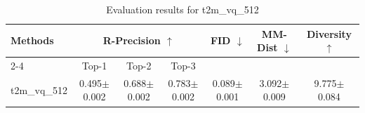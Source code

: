 \begin{table}[h]
\centering
\begin{tabular}{l ccc ccc}
\toprule
\multirow{2}{*}{\textbf{Methods}} & \multicolumn{3}{c}{\textbf{R-Precision $\uparrow$}} & \multirow{2}{*}{\textbf{FID $\downarrow$}} & \multirow{2}{*}{\textbf{MM-Dist $\downarrow$}} & \multirow{2}{*}{\textbf{Diversity $\uparrow$}} \\
\cmidrule(lr){2-4}
& Top-1 & Top-2 & Top-3 & & & \\
\midrule
t2m_vq_512 & 0.495$\pm$0.002 & 0.688$\pm$0.002 & 0.783$\pm$0.002 & 0.089$\pm$0.001 & 3.092$\pm$0.009 & 9.775$\pm$0.084 \\
\bottomrule
\end{tabular}
\caption{Evaluation results for t2m_vq_512}
\label{tab:results_t2m_vq_512}
\end{table}
